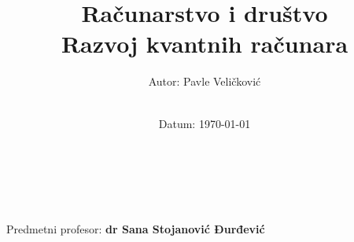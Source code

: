 \title{\Large  Računarstvo i društvo  \\[0.5cm]
        \bf\Large Razvoj kvantnih računara}
\author{\large Autor: Pavle Veličković\\ \ \\}
\date{\large Datum: \today}

\makeatletter
    \begin{titlepage}
        \begin{center}
	    {\ \\ \ \\}
        \vbox{}\vspace{5cm}
            {\@title }\\[3cm] 
            {\@author}
            {\large Predmetni profesor: \bf dr Sana Stojanović Đurđević\\  \ \\}
            {\@date\\}

        \end{center}
    \end{titlepage}
\makeatother